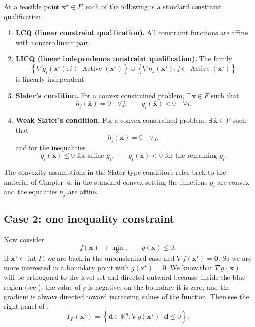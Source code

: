 \begin{definition}
\label{def:ch7-cq}
At a feasible point $\mathbf{x}^\star\in F$, each of the following is a standard
constraint qualification.
\begin{enumerate}
  \item \textbf{LCQ (linear constraint qualification).}
  All constraint functions are affine with nonzero linear part.

  \item \textbf{LICQ (linear independence constraint qualification).}
  The family
  \[
    \left\{\nabla g_i(\mathbf{x}^\star): i\in\operatorname{Active}(\mathbf{x}^\star)\right\}
    \cup
    \left\{\nabla h_j(\mathbf{x}^\star): j\in\operatorname{Active}(\mathbf{x}^\star)\right\}
  \]
  is linearly independent.

  \item \textbf{Slater's condition.}
  For a convex constrained problem, $\exists\, \bar{\mathbf{x}}\in F$ such
  that
  \[
    h_j(\bar{\mathbf{x}})=0 \quad \forall j,
    \qquad
    g_i(\bar{\mathbf{x}})<0 \quad \forall i.
  \]

  \item \textbf{Weak Slater's condition.}
  For a convex constrained problem, $\exists\, \bar{\mathbf{x}}\in F$ such
  that
  \[
    h_j(\bar{\mathbf{x}})=0 \quad \forall j,
  \]
  and for the inequalities,
  \[
    g_i(\bar{\mathbf{x}})\le 0 \text{ for affine } g_i,
    \qquad
    g_i(\bar{\mathbf{x}})<0 \text{ for the remaining } g_i.
  \]
\end{enumerate}
\end{definition}

The convexity assumptions in the Slater-type conditions refer back to the
material of Chapter~4: in the standard convex setting 
the functions $g_i$ are convex and the equalities $h_j$ are affine.

\subsection{Case 2: one inequality constraint}
Now consider
\[
  f(\mathbf{x}) \to \min_{\mathbf{x}},
  \qquad
  g(\mathbf{x}) \le 0.
\]
If $\mathbf{x}^\star\in \operatorname{int} F$, we are back in the unconstrained
case and $\nabla f(\mathbf{x}^\star)=\mathbf{0}$. So we are more interested in
a boundary point with
$g(\mathbf{x}^\star)=0$. We know that $\nabla g(\mathbf{x})$ will be orthogonal
to the level set and directed outward because, inside the blue region
(see ), the value of $g$ is negative, on the
boundary it is zero, and the gradient is always directed toward increasing
values of the function.
Then see the right panel of
:
\begin{equation}
  \label{eq:ch7-tangent-one-inequality}
  T_F(\mathbf{x}^\star)
  =
  \left\{
    \mathbf{d}\in\mathbb{R}^n:
    \nabla g(\mathbf{x}^\star)^\top \mathbf{d}\le 0
  \right\}.
\end{equation}


